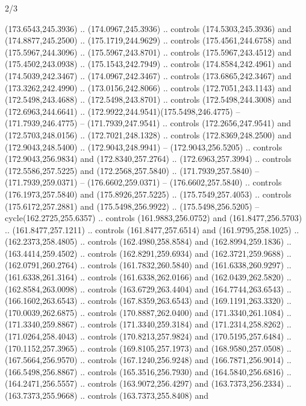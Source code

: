 \begin{flagdescription}{2/3}
\begin{scope}[xshift=0.5\flaglength,yshift=0.5\flagwidth,scale=\flagwidth/235.81]
\begin{scope}[y=0.8pt, x=0.8pt, yscale=-1,shift={(-239.08,-147.38)}]
    (173.6543,245.3936) .. (174.0967,245.3936) .. controls (174.5303,245.3936) and
    (174.8877,245.2500) .. (175.1719,244.9629) .. controls (175.4561,244.6758) and
    (175.5967,244.3096) .. (175.5967,243.8701) .. controls (175.5967,243.4512) and
    (175.4502,243.0938) .. (175.1543,242.7949) .. controls (174.8584,242.4961) and
    (174.5039,242.3467) .. (174.0967,242.3467) .. controls (173.6865,242.3467) and
    (173.3262,242.4990) .. (173.0156,242.8066) .. controls (172.7051,243.1143) and
    (172.5498,243.4688) .. (172.5498,243.8701) .. controls (172.5498,244.3008) and
    (172.6963,244.6641) .. (172.9922,244.9541)(175.5498,246.4775) --
    (171.7939,246.4775) -- (171.7939,247.9541) .. controls (172.2656,247.9541) and
    (172.5703,248.0156) .. (172.7021,248.1328) .. controls (172.8369,248.2500) and
    (172.9043,248.5400) .. (172.9043,248.9941) -- (172.9043,256.5205) .. controls
    (172.9043,256.9834) and (172.8340,257.2764) .. (172.6963,257.3994) .. controls
    (172.5586,257.5225) and (172.2568,257.5840) .. (171.7939,257.5840) --
    (171.7939,259.0371) -- (176.6602,259.0371) -- (176.6602,257.5840) .. controls
    (176.1973,257.5840) and (175.8926,257.5225) .. (175.7549,257.4053) .. controls
    (175.6172,257.2881) and (175.5498,256.9922) .. (175.5498,256.5205) --
    cycle(162.2725,255.6357) .. controls (161.9883,256.0752) and
    (161.8477,256.5703) .. (161.8477,257.1211) .. controls (161.8477,257.6514) and
    (161.9795,258.1025) .. (162.2373,258.4805) .. controls (162.4980,258.8584) and
    (162.8994,259.1836) .. (163.4414,259.4502) .. controls (162.8291,259.6934) and
    (162.3721,259.9688) .. (162.0791,260.2764) .. controls (161.7832,260.5840) and
    (161.6338,260.9297) .. (161.6338,261.3164) .. controls (161.6338,262.0166) and
    (162.0439,262.5820) .. (162.8584,263.0098) .. controls (163.6729,263.4404) and
    (164.7744,263.6543) .. (166.1602,263.6543) .. controls (167.8359,263.6543) and
    (169.1191,263.3320) .. (170.0039,262.6875) .. controls (170.8887,262.0400) and
    (171.3340,261.1084) .. (171.3340,259.8867) .. controls (171.3340,259.3184) and
    (171.2314,258.8262) .. (171.0264,258.4043) .. controls (170.8213,257.9824) and
    (170.5195,257.6484) .. (170.1152,257.3965) .. controls (169.8105,257.1973) and
    (168.9580,257.0508) .. (167.5664,256.9570) .. controls (167.1240,256.9248) and
    (166.7871,256.9014) .. (166.5498,256.8867) .. controls (165.3516,256.7930) and
    (164.5840,256.6816) .. (164.2471,256.5557) .. controls (163.9072,256.4297) and
    (163.7373,256.2334) .. (163.7373,255.9668) .. controls (163.7373,255.8408) and

\end{scope}
\end{scope}
\end{flagdescription}
